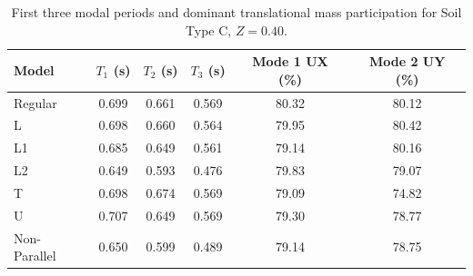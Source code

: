 \begin{table}[!htbp]
\centering
\caption{First three modal periods and dominant translational mass participation for Soil Type C, $Z=0.40$.}
\label{tab:modal_period_mass_z040}
\small
\begin{tabular}{@{}lccccc@{}}
\toprule
Model & $T_1$ (s) & $T_2$ (s) & $T_3$ (s) & Mode 1 UX (\%) & Mode 2 UY (\%) \\
\midrule
Regular & 0.699 & 0.661 & 0.569 & 80.32 & 80.12 \\
L & 0.698 & 0.660 & 0.564 & 79.95 & 80.42 \\
L1 & 0.685 & 0.649 & 0.561 & 79.14 & 80.16 \\
L2 & 0.649 & 0.593 & 0.476 & 79.83 & 79.07 \\
T & 0.698 & 0.674 & 0.569 & 79.09 & 74.82 \\
U & 0.707 & 0.649 & 0.569 & 79.30 & 78.77 \\
Non-Parallel & 0.650 & 0.599 & 0.489 & 79.14 & 78.75 \\
\bottomrule
\end{tabular}
\end{table}
